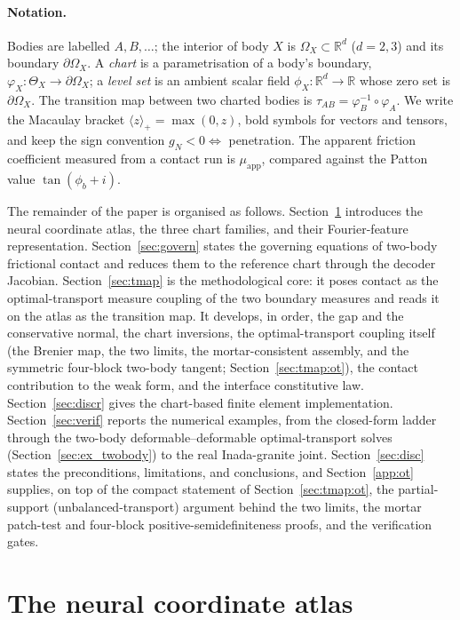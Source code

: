 \documentclass{svjour3}                 %
\newcommand{\R}{\mathbb{R}}
\newcommand{\gn}{g_{\scriptscriptstyle N}}
\newcommand{\tmap}{\tau_{AB}}
\newcommand{\map}[1]{\varphi_{#1}}
\newcommand{\pos}[1]{\langle #1\rangle_{+}}
\newcommand{\muapp}{\mu_{\mathrm{app}}}
\begin{document}
\paragraph{Notation.}
Bodies are labelled $A,B,\dots$; the interior of body $X$ is $\Omega_X\subset\R^d$ ($d=2,3$) and its boundary
$\partial\Omega_X$. A \emph{chart} is a parametrisation of a body's boundary, $\map{X}:\Theta_X\to
\partial\Omega_X$; a \emph{level set} is an ambient scalar field $\phi_X:\R^d\to\R$ whose zero set is
$\partial\Omega_X$. The transition map between two charted bodies is $\tmap=\map{B}^{-1}\circ\map{A}$. We write
the Macaulay bracket $\pos{z}=\max(0,z)$, bold symbols for vectors and tensors, and keep the sign convention
$\gn<0\Leftrightarrow$ penetration. The apparent friction coefficient measured from a contact run is $\muapp$,
compared against the Patton value $\tan(\phi_b+i)$.

The remainder of the paper is organised as follows. Section~\ref{sec:atlas} introduces the neural coordinate
atlas, the three chart families, and their Fourier-feature representation. Section~\ref{sec:govern} states the
governing equations of two-body frictional contact and reduces them to the reference chart through the decoder
Jacobian. Section~\ref{sec:tmap} is the methodological core: it poses contact as the optimal-transport measure coupling of
the two boundary measures and reads it on the atlas as the transition map. It develops, in order, the gap and the
conservative normal, the chart inversions, the optimal-transport coupling itself (the Brenier map, the two
limits, the mortar-consistent assembly, and the symmetric four-block two-body tangent;
Section~\ref{sec:tmap:ot}), the contact contribution to the weak form, and the interface constitutive law. Section~\ref{sec:discr} gives the chart-based finite element implementation.
Section~\ref{sec:verif} reports the numerical examples, from the closed-form ladder through the two-body
deformable--deformable optimal-transport solves (Section~\ref{sec:ex_twobody}) to the
real Inada-granite joint. Section~\ref{sec:disc} states the preconditions, limitations, and conclusions, and
Section~\ref{app:ot} supplies, on top of the compact statement of Section~\ref{sec:tmap:ot}, the partial-support
(unbalanced-transport) argument behind the two limits, the mortar patch-test and four-block
positive-semidefiniteness proofs, and the verification gates.


\section{The neural coordinate atlas}\label{sec:atlas}
\end{document}
